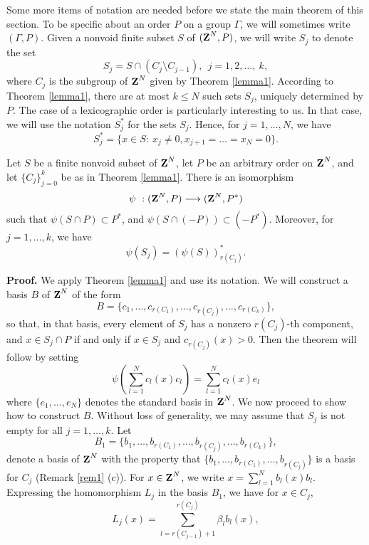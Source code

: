 Some more items of notation are
needed before we state the main theorem of this section.
To be specific about an order $P$ on a group $\Gamma$,
we will sometimes write $(\Gamma, P)$.   
Given a nonvoid finite subset $S$ of $(\Z^N,P)$, 
we will write
$S_j$ to denote the set
$$S_j=S\cap (C_j\setminus C_{j-1}),\ \ j=1,2,\ldots,\ k,$$
where $C_j$ is the subgroup of $\Z^N$ given by Theorem 
\ref{lemma1}.  According to Theorem 
\ref{lemma1}, there are at most $k\leq N$ such sets $S_j$,
uniquely determined by $P$.
The case of a lexicographic order is particularly interesting to us.
In that case, we will use the notation $S^*_j$ for the sets
$S_j$.  Hence, for $j=1,\ldots, N$, we have
$$S_j^*=\{x\in S:\ x_j\neq 0, x_{j+1}=\ldots=x_N=0\}.$$
\begin{theorem4}
Let $S$ be a finite nonvoid subset of $\Z^N$,
let $P$ be an arbitrary order on $\Z^N$,
and let $\{C_j\}_{j=0}^k$ be as in Theorem \ref{lemma1}.  
There is an isomorphism
$$\psi\ :(\Z^N,P)\longrightarrow  (\Z^N,P^*)$$
such that $\psi(S\cap P)\subset P^*$, and
$\psi(S\cap (-P))\subset (-P^*)$.  Moreover,
for $j=1,\ldots,k$, we have
$$\psi\left(S_j\right)=\left(\psi(S)\right)^*_{r(C_j)}.$$ 
\label{theorem4}
\end{theorem4}
{\bf Proof.} We apply Theorem \ref{lemma1} and use its notation.
We will construct a basis $B$ of $\Z^N$ of the form
$$B=\{c_1,\ldots,c_{r(C_1)},\ldots,c_{r(C_j)},\ldots,c_{r(C_k)}\},$$
so that, in that basis, every
element of $S_j$ has a nonzero
$r(C_j)$-th component, and $x\in S_j\cap P$ if and
only if $x\in S_j$ and $c_{r(C_j)}(x)>0$.  Then
the theorem will follow by setting
$$\psi\left(
\sum_{l=1}^N c_l(x)c_l\right)=\sum_{l=1}^N c_l(x)e_l
$$
where $\{e_1,\ldots,e_N\}$ denotes the standard 
basis in $\Z^N$.  
We now proceed to show how to construct $B$.
Without loss of generality,
we may assume that $S_j$ is not empty for all $j=1,\ldots,k$.
Let
$$B_1=\{b_1,\ldots,b_{r(C_1)},\ldots,b_{r(C_j)},\ldots,b_{r(C_k)}\},$$
denote a basis of $\Z^N$ with the property that
$\{b_1,\ldots,b_{r(C_1)},\ldots,b_{r(C_j)}\}$
is a basis for $C_j$ (Remark \ref{rem1} (c)).
For $x\in \Z^N$, we write  
$x=\sum_{l=1}^Nb_l(x)b_l$.
Expressing the homomorphism
$L_j$ in the basis $B_1$, we have for
 $x\in C_j$, 
\begin{equation}
L_j(x)=\sum_{l=r(C_{j-1})+1}^{r(C_j)}
\beta_lb_l(x),
\label{lj}
\end{equation}
